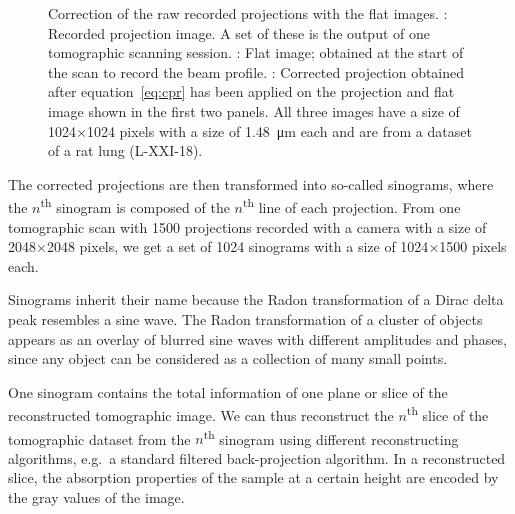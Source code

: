 \begin{figure}
{%
		\label{subfig:cpr}%
		}%
	\caption[Correction of the projections with flat images]{Correction of the raw recorded projections with the flat images. : Recorded projection image. A set of these is the output of one tomographic scanning session. : Flat image; obtained at the start of the scan to record the beam profile. : Corrected projection obtained after equation~\ref{eq:cpr} has been applied on the projection and flat image shown in the first two panels. All three images have a size of 1024$\times$1024 pixels with a size of \SI{1.48}{\micro\meter} each and are from a dataset of a rat lung (L-XXI-18).}
	\label{fig:corrected projection}
\end{figure}

The corrected projections are then transformed into so-called sinograms, where the $n$\textsuperscript{th} sinogram is composed of the $n$\textsuperscript{th} line of each projection. From one tomographic scan with 1500 projections recorded with a camera with a size of 2048$\times$2048 pixels, we get a set of 1024 sinograms with a size of 1024$\times$1500 pixels each.

Sinograms inherit their name because the Radon transformation of a Dirac delta peak resembles a sine wave. The Radon transformation of a cluster of objects appears as an overlay of blurred sine waves with different amplitudes and phases, since any object can be considered as a collection of many small points.

One sinogram contains the total information of one plane or slice of the reconstructed tomographic image. We can thus reconstruct the $n$\textsuperscript{th} slice of the tomographic dataset from the $n$\textsuperscript{th} sinogram using different reconstructing algorithms, e.g.\ a standard filtered back-projection algorithm. In a reconstructed slice, the absorption properties of the sample at a certain height are encoded by the gray values of the image.

